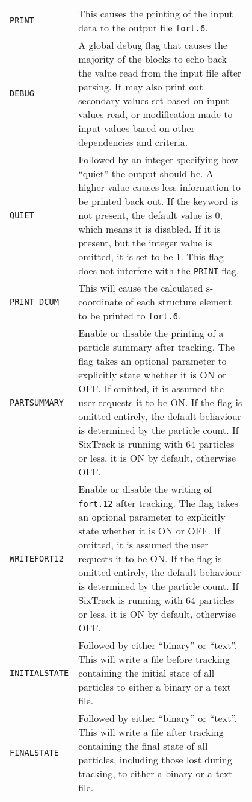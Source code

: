 \bigskip
\begin{tabular}{@{}lp{0.8\linewidth}}
    \texttt{PRINT} & This causes the printing of the input data to the output file \texttt{fort.6}. \\
    \texttt{DEBUG} & A global debug flag that causes the majority of the blocks to echo back the value read from the input file after parsing. It may also print out secondary values set based on input values read, or modification made to input values based on other dependencies and criteria.\index{DEBUG}\\
    \texttt{QUIET} & Followed by an integer specifying how ``quiet'' the output should be. A higher value causes less information to be printed back out. If the keyword is not present, the default value is 0, which means it is disabled. If it is present, but the integer value is omitted, it is set to be 1. This flag does not interfere with the \texttt{PRINT} flag.\index{QUIET}\\
    \texttt{PRINT\_DCUM} & This will cause the calculated s-coordinate of each structure element to be printed to \texttt{fort.6}. \\
    \texttt{PARTSUMMARY} & Enable or disable the printing of a particle summary after tracking. The flag takes an optional parameter to explicitly state whether it is ON or OFF. If omitted, it is assumed the user requests it to be ON. If the flag is omitted entirely, the default behaviour is determined by the particle count. If SixTrack is running with 64 particles or less, it is ON by default, otherwise OFF.\index{particle summary}\\
    \texttt{WRITEFORT12} & Enable or disable the writing of \texttt{fort.12} after tracking. The flag takes an optional parameter to explicitly state whether it is ON or OFF. If omitted, it is assumed the user requests it to be ON. If the flag is omitted entirely, the default behaviour is determined by the particle count. If SixTrack is running with 64 particles or less, it is ON by default, otherwise OFF.\index{fort.12}\\
    \texttt{INITIALSTATE} & Followed by either ``binary'' or ``text''. This will write a file before tracking containing the initial state of all particles to either a binary or a text file.\index{initial state}\\
    \texttt{FINALSTATE} & Followed by either ``binary'' or ``text''. This will write a file after tracking containing the final state of all particles, including those lost during tracking, to either a binary or a text file.\index{final state}\\
\end{tabular}


